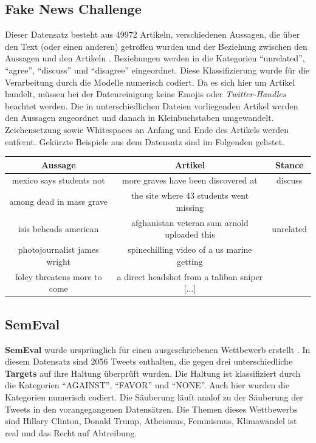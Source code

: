 \subsection{Fake News Challenge}
\label{sec:tfnc}
Dieser Datensatz besteht aus 49972 Artikeln, verschiedenen Aussagen, die \"uber den Text (oder einen anderen) getroffen wurden und der Beziehung zwischen den Aussagen und den Artikeln \cite{fnc}. Beziehungen werden in die Kategorien "`unrelated"', "`agree"', "`discuss"' und "`disagree"' eingeordnet. Diese Klassifizierung wurde f\"ur die Verarbeitung durch die Modelle numerisch codiert. Da es sich hier um Artikel handelt, m\"ussen bei der Datenreinigung keine Emojis oder \textit{Twitter-Handles} beachtet werden. Die in unterschiedlichen Dateien vorliegenden Artikel werden den Aussagen zugeordnet und danach in Kleinbuchstaben umgewandelt. Zeichensetzung sowie Whitespaces an Anfang und Ende des Artikels werden entfernt. Gek\"urzte Beispiele aus dem Datensatz sind im Folgenden gelistet.
\begin{center}
\begin{tabular}{|c|c|c|}
\hline
Aussage & Artikel & Stance\\ 
\hline\hline
 mexico says students not& more graves have been discovered at  & discuss\\
 among dead in mass grave & the site where 43 students went missing &\\
\hline
isis beheads american & afghanistan veteran sam arnold uploaded this & unrelated\\
 photojournalist james wright & spinechilling  video of a us marine getting &\\
 foley threatens more to come & a direct headshot from a taliban sniper [...] &\\
\hline    
\end{tabular}
\end{center}

\subsection{SemEval}
\label{sec:semeval}
\textbf{SemEval} wurde urspr\"unglich f\"ur einen ausgeschriebenen Wettbewerb erstellt \cite{semeval}. In diesem Datensatz sind 2056 Tweets enthalten, die gegen drei unterschiedliche \textbf{Targets} auf ihre Haltung \"uberpr\"uft wurden. Die Haltung ist klassifiziert durch die Kategorien "`AGAINST"', "`FAVOR"' und "`NONE"'. Auch hier wurden die Kategorien numerisch codiert. Die S\"auberung l\"auft analof zu der S\"auberung der Tweets in den vorangegangenen Datens\"atzen. Die Themen dieses Wettbewerbs sind Hillary Clinton, Donald Trump, Atheismus, Feminismus, Klimawandel ist real und das Recht auf Abtreibung.

